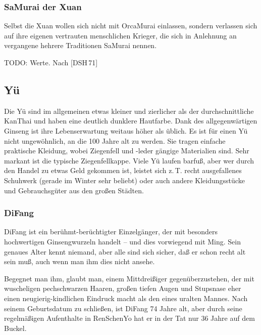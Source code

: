 \documentclass[
a4paper,
twoside,
DIV=calc,
BCOR=4mm,
fontsize=9pt,
twocolumn=on,
titlepage=on,
parskip=half
]{scrartcl}
\begin{document}
\subsubsection{SaMurai der Xuan}

Selbst die Xuan wollen sich nicht mit OrcaMurai einlassen, sondern
verlassen sich auf ihre eigenen vertrauten menschlichen Krieger, die
sich in Anlehnung an vergangene hehrere Traditionen SaMurai nennen.

TODO: Werte. Nach [DSH\,71]

\subsection{Yü}

Die Yü sind im allgemeinen etwas kleiner und zierlicher als der
durchschnittliche KanThai und haben eine deutlich dunklere
Hautfarbe. Dank des allgegenwärtigen Ginseng ist ihre Lebenserwartung
weitaus höher als üblich. Es ist für einen Yü nicht ungewöhnlich, an die
100 Jahre alt zu werden. Sie tragen einfache praktische Kleidung,
wobei Ziegenfell und -leder gängige Materialien sind. Sehr markant ist
die typische Ziegenfellkappe. Viele Yü laufen barfuß, aber wer durch
den Handel zu etwas Geld gekommen ist, leistet sich z.\,T. recht
ausgefallenes Schuhwerk (gerade im Winter sehr beliebt) oder auch
andere Kleidungsstücke und Gebrauchsgüter aus den großen Städten.

\subsubsection{DiFang}

DiFang ist ein berühmt-berüchtigter Einzelgänger, der mit besonders
hochwertigen Ginsengwurzeln handelt -- und dies vorwiegend mit
Ming. Sein genaues Alter kennt niemand, aber alle sind sich sicher,
daß er schon recht alt sein muß, auch wenn man ihm dies nicht ansehe.

Begegnet man ihm, glaubt man, einem Mittdreißiger gegenüberzustehen,
der mit wuscheligen pechschwarzen Haaren, großen tiefen Augen und
Stupsnase eher einen neugierig-kindlichen Eindruck macht als den eines
uralten Mannes. Nach seinem Geburtsdatum zu schließen, ist DiFang 74
Jahre alt, aber durch seine regelmäßigen Aufenthalte in RenSchenYo hat
er in der Tat nur 36 Jahre auf dem Buckel.
\end{document}

